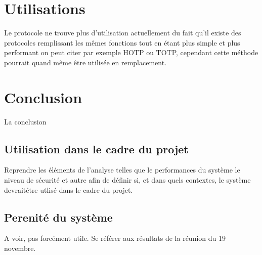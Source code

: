 \documentclass{../res/univ-projet}
\begin{document}
\section{Utilisations}
  Le protocole ne trouve plus d'utilisation actuellement du fait qu'il existe des protocoles remplissant
  les mêmes fonctions tout en étant plus simple et plus performant on peut citer par exemple HOTP ou TOTP, cependant
  cette méthode pourrait quand même être utilisée en remplacement.
  
\section{Conclusion}
  La conclusion
  \subsection{Utilisation dans le cadre du projet}
    Reprendre les éléments de l'analyse telles que le performances du système 
le 
niveau de sécurité et autre afin de définir si, et dans quels contextes, le 
système devrait\^etre utlisé dans le cadre du projet.
  
  \subsection{Perenité du système}
    A voir, pas forcément utile. Se référer aux résultats de la réunion du 19 
novembre.
    
\end{document}
